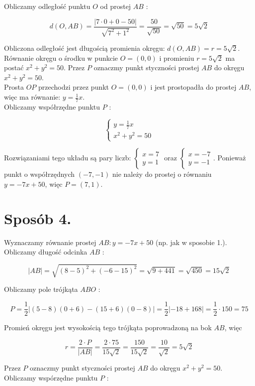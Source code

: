 \documentclass[10pt]{article}
\begin{document}
Obliczamy odległość punktu $O$ od prostej $A B$ :

$$
d(O, A B)=\frac{|7 \cdot 0+0-50|}{\sqrt{7^{2}+1^{2}}}=\frac{50}{\sqrt{50}}=\sqrt{50}=5 \sqrt{2}
$$

Obliczona odległość jest długością promienia okręgu: $d(O, A B)=r=5 \sqrt{2}$.\\
Równanie okręgu o środku w punkcie $O=(0,0)$ i promieniu $r=5 \sqrt{2}$ ma postać $x^{2}+y^{2}=50$. Przez $P$ oznaczmy punkt styczności prostej $A B$ do okręgu $x^{2}+y^{2}=50$.\\
Prosta $O P$ przechodzi przez punkt $O=(0,0)$ i jest prostopadła do prostej $A B$, więc ma równanie: $y=\frac{1}{7} x$.\\
Obliczamy współrzędne punktu $P$ :

$$
\left\{\begin{array}{l}
y=\frac{1}{7} x \\
x^{2}+y^{2}=50
\end{array}\right.
$$

Rozwiązaniami tego układu są pary liczb: $\left\{\begin{array}{l}x=7 \\ y=1\end{array}\right.$ oraz $\left\{\begin{array}{l}x=-7 \\ y=-1\end{array}\right.$. Ponieważ punkt o współrzędnych $(-7,-1)$ nie należy do prostej o równaniu $y=-7 x+50$, więc $P=(7,1)$.

\section*{Sposób 4.}
Wyznaczamy równanie prostej $A B: y=-7 x+50$ (np. jak w sposobie 1.).\\
Obliczamy długość odcinka $A B$ :

$$
|A B|=\sqrt{(8-5)^{2}+(-6-15)^{2}}=\sqrt{9+441}=\sqrt{450}=15 \sqrt{2}
$$

Obliczamy pole trójkąta $A B O$ :

$$
P=\frac{1}{2}|(5-8)(0+6)-(15+6)(0-8)|=\frac{1}{2}|-18+168|=\frac{1}{2} \cdot 150=75
$$

Promień okręgu jest wysokością tego trójkąta poprowadzoną na bok $A B$, więc

$$
r=\frac{2 \cdot P}{|A B|}=\frac{2 \cdot 75}{15 \sqrt{2}}=\frac{150}{15 \sqrt{2}}=\frac{10}{\sqrt{2}}=5 \sqrt{2}
$$

Przez $P$ oznaczmy punkt styczności prostej $A B$ do okręgu $x^{2}+y^{2}=50$.\\
Obliczamy wspórzędne punktu $P$ :
\end{document}
